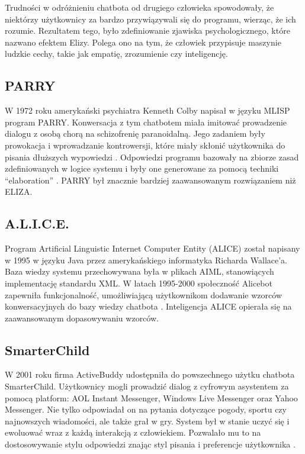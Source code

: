         Trudności w odróżnieniu chatbota od drugiego człowieka spowodowały, że niektórzy użytkownicy za bardzo przywiązywali się do programu, wierząc, że ich rozumie. Rezultatem tego, było zdefiniowanie zjawiska psychologicznego, które nazwano efektem Elizy. Polega ono na tym, że człowiek przypisuje maszynie ludzkie cechy, takie jak empatię, zrozumienie czy inteligencję.


        \subsection{PARRY}
        W 1972 roku amerykański psychiatra Kenneth Colby napisał w języku MLISP program PARRY. Konwersacja z tym chatbotem miała imitować prowadzenie dialogu z osobą chorą na schizofrenię paranoidalną. Jego zadaniem były prowokacja i wprowadzanie kontrowersji, które miały skłonić użytkownika do pisania dłuższych wypowiedzi \cite{history_of_chatbots2019}. Odpowiedzi programu bazowały na zbiorze zasad zdefiniowanych w logice systemu i były one generowane za pomocą techniki “elaboration” \cite{from_eliza_to_chatgpt2024}. PARRY był znacznie bardziej zaawansowanym rozwiązaniem niż ELIZA.


        \subsection{A.L.I.C.E.}
        Program Artificial Linguistic Internet Computer Entity (ALICE) został napisany w 1995 w języku Java przez amerykańskiego informatyka Richarda Wallace'a. Baza wiedzy systemu przechowywana była w plikach AIML, stanowiących implementację standardu XML. W latach 1995-2000 społeczność Alicebot zapewniła funkcjonalność, umożliwiającą użytkownikom dodawanie wzorców konwersacyjnych do bazy wiedzy chatbota \cite{alice2015}. Inteligencja ALICE opierała się na zaawansowanym dopasowywaniu wzorców.


        \subsection{SmarterChild}
        W 2001 roku firma ActiveBuddy udostępniła do powszechnego użytku chatbota SmarterChild. Użytkownicy mogli prowadzić dialog z cyfrowym asystentem za pomocą platform: AOL Instant Messenger, Windows Live Messenger oraz Yahoo Messenger. Nie tylko odpowiadał on na pytania dotyczące pogody, sportu czy najnowszych wiadomości, ale także grał w gry. System był w stanie uczyć się i ewoluować wraz z każdą interakcją z człowiekiem. Pozwalało mu to na dostosowywanie stylu odpowiedzi znając styl pisania i preferencje użytkownika \cite{from_eliza_to_chatgpt2024}.
    

